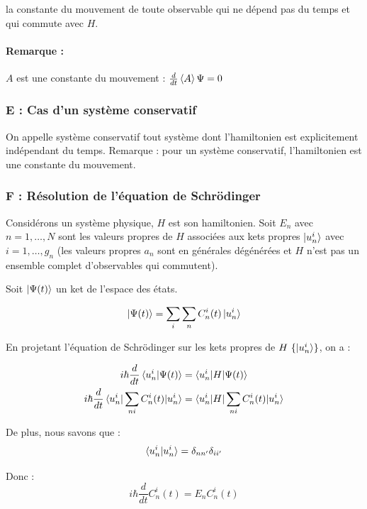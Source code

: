 \documentclass[12pt,a4paper,titlepage]{book}
\begin{document}
la constante du mouvement de toute observable qui ne dépend pas du temps et qui commute avec $H$.

\paragraph*{Remarque :}

$A$ est une constante du mouvement : $\frac{d}{dt} \braket{A}\Psi = 0$

\subsubsection{E : Cas d'un système conservatif}
On appelle système conservatif tout système dont l'hamiltonien est explicitement indépendant du temps. Remarque : pour un système conservatif, l'hamiltonien est une constante du mouvement.
\subsubsection{F : Résolution de l'équation de Schrödinger}
Considérons un système physique, $H$ est son hamiltonien. Soit $E_n$ avec $n = 1, \ldots, N$ sont les valeurs propres de $H$ associées aux kets propres $\ket{u_n^i}$ avec $i = 1, \ldots, g_n$ (les valeurs propres $a_n$ sont en générales dégénérées et $H$ n'est pas un ensemble complet d'observables qui commutent).

Soit $\ket{\Psi (t)}$ un ket de l'espace des états.

\begin{equation*}
\ket{\Psi (t)} = \sum\limits_i \sum\limits_n C_n^i (t) \ket{u_n^i}
\end{equation*}

En projetant l'équation de Schrödinger sur les kets propres de $H~\lbrace \ket{u_n^i} \rbrace$, on a :

\begin{align*}
i \hbar \frac{d}{dt} \braket{u_n^i | \Psi (t)} &= \braket{ u_n^i | H | \Psi (t)}\\
i \hbar \frac{d}{dt} \braket{u_n^i | \sum\limits_{n i} C_n^i (t) | u_n^i} &= \braket{ u_n^i | H | \sum\limits_{n i} C_n^i (t) | u_n^i}
\end{align*}

De plus, nous savons que :
\begin{equation*}
\braket{u_n^i | u_n^i} = \delta_{nn'} \delta_{ii'}
\end{equation*}

Donc : 
\begin{equation*}
i \hbar \frac{d}{dt} C_n^i (t) = E_n C_n^i (t)
\end{equation*}
\end{document}
